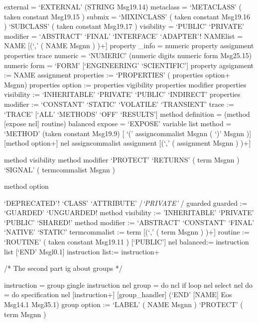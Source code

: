 external = `EXTERNAL' (STRING \textbar{} Msg19.14) metaclass =
`METACLASS' ( taken constant \textbar{} Msg19.15 ) submix = `MIXINCLASS'
( taken constant \textbar{} Msg19.16 ) \textbar{} `SUBCLASS' ( taken
constant \textbar{} Msg19.17 ) visibility = `PUBLIC' \textbar{}
`PRIVATE' modifier = `ABSTRACT' \textbar{} `FINAL' \textbar{}
`INTERFACE' \textbar{} `ADAPTER'! NAMElist = NAME {[}(`,' ( NAME
\textbar{} Msgnn ) )+{]} property \_info = numeric \textbar{} property
assignment \textbar{} properties \textbar{} trace numeric = `NUMERIC'
(numeric digits \textbar{} numeric form \textbar{} Msg25.15) numeric
form = `FORM' {[}`ENGINEERING' \textbar{} `SCIENTIFIC'{]} property
agsignment := NAME \textbar{} assignment properties := `PROPERTIES' (
properties option+ \textbar{} Msgnn) properties option := properties
vigibility \textbar{} properties modifier properties visibility :=
`INHERITABLE' \textbar{} `PRIVATE' \textbar{} `PUBLIC' \textbar{}
`INDIRECT' properties modifier := `CONSTANT' \textbar{} `STATIC'
\textbar{} `VOLATILE' \textbar{} `TRANSIENT' trace := `TRACE' {[}`ALL'
\textbar{} `METHODS' \textbar{} `OFF' \textbar{} `RESULTS'{]} method
definition = (method {[}expose ncl{]}\textbar{} routine) balanced expose
= `EXPOSE' variable list method = `METHOD' (taken constant \textbar{}
Msg19.9) {[} `(' assigncommalist \textbar{} Msgnn ( `)' \textbar{} Msgnn
){]} {[}method option+{]} nel assigncommalist assignment {[}(`,' (
assignment \textbar{} Msgnn ) )+{]}

method visibility \textbar{} method modifier \textbar{} `PROTECT'
\textbar{} `RETURNS' ( term \textbar{} Msgnn ) \textbar{} `SIGNAL' (
termcommalist \textbar{} Msgnn )

method option

`DEPRECATED'! `CLASS' \textbar{} `ATTRIBUTE' \textbar{} /\emph{`PRIVATE'
\textbar{} }/ guarded guarded := `GUARDED' \textbar{} `UNGUARDED! method
visibility := 'INHERITABLE' \textbar{} `PRIVATE' \textbar{} `PUBLIC'
\textbar{} `SHARED!' method modifier := `ABSTRACT' \textbar{} `CONSTANT'
\textbar{} `FINAL' \textbar{} `NATIVE' \textbar{} `STATIC' termcommalist
:= term {[}(`,' ( term \textbar{} Msgnn ) )+{]} routine := `ROUTINE' (
taken constant \textbar{} Msg19.11 ) {[}`PUBLIC'{]} nel balanced:=
instruction list {[}`END' Msgl0.1{]} instruction list:= instruction+

/* The second part ig about groups */

instruction = group \textbar{} gingle instruction nel group = do ncl
\textbar{} if \textbar{} loop nel \textbar{} select nel do = do
specification nel {[}instruction+{]} {[}group\_handler{]} (`END'
{[}NAME{]} \textbar{} Eos Msg14.1 \textbar{} Msg35.1) group option :=
`LABEL' ( NAME \textbar{} Msgnn ) \textbar{} `PROTECT' ( term \textbar{}
Msgnn )

